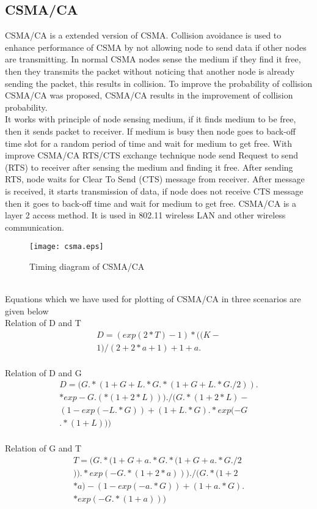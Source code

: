 \documentclass[10pt, conference, compsocconf]{IEEEtran}
\begin{document}
\subsection{CSMA/CA}
CSMA/CA is a extended version of CSMA. Collision avoidance is used to enhance performance of CSMA by not allowing node to send data if other nodes are transmitting. In normal CSMA nodes sense the medium if they find it free, then they transmits the packet without noticing that another node is already sending the packet, this results in collision. To improve the probability of collision CSMA/CA was proposed, CSMA/CA results in the improvement of collision probability.\\
\indent It works with principle of node sensing medium, if it finds medium to be free, then it sends packet to receiver. If medium is busy then node goes to back-off time slot for a random period of time and wait for medium to get free. With improve CSMA/CA RTS/CTS exchange technique node send Request to send (RTS) to receiver after sensing the medium and finding it free. After sending RTS, node waits
for Clear To Send (CTS) message from receiver. After message is received, it starts transmission of data, if node does not receive CTS message
then it goes to back-off time and wait for medium to get free. CSMA/CA is a layer 2 access method.  It is used in 802.11 wireless LAN and other wireless communication.
\begin{figure}[!h]
\centering
\caption{Timing diagram of CSMA/CA}
\texttt{[image: csma.eps]}
\end{figure}
\\
Equations which we have used for plotting of CSMA/CA in three scenarios are given below
\\
Relation of D and T
\begin{eqnarray}
D=(exp(2*T)-1)*((K-\nonumber\\
1)/(2+2*a+1)+1+a.
\end{eqnarray}
\\
Relation of D and G
\begin{eqnarray}
D=(G.*(1+G+L.*G.*(1+G+L.*G./2)).\nonumber\\
*exp-G.(*(1+2*L)))./(G.*(1+2*L)-\nonumber\\
(1-exp(-L.*G))+(1+L.*G).*exp(-G \nonumber\\
.*(1+L)))
\end{eqnarray}
\\
Relation of G and T
\begin{eqnarray}
T=(G.*(1+G+a.*G.*(1+G+a.*G./2 \nonumber\\
)).*exp(-G.*(1+2*a)))./(G.*(1+2  \nonumber\\
*a)-(1-exp(-a.*G))+(1+a.*G).   \nonumber\\
*exp(-G.*(1+a)))
\end{eqnarray}
\\
\end{document}
